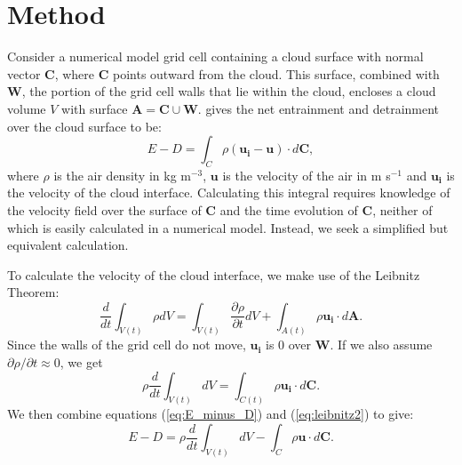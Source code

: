 \documentclass[12pt]{article}
\begin{document}

\section{Method}

Consider a numerical model grid cell containing a cloud surface with normal 
vector $\mathbf{C}$, where $\mathbf{C}$ points outward from the cloud.  This 
surface, combined with $\mathbf{W}$, the portion of the grid cell walls that 
lie within the cloud, encloses a cloud volume $V$ with surface $\mathbf{A}
= \mathbf{C} \cup \mathbf{W}$.  \cite{Siebesma1998} gives the net entrainment 
and detrainment over the cloud surface to be:
\begin{equation}
\label{eq:E_minus_D} 
E - D = \int_C \rho ( \mathbf{u_i} -  \mathbf{u}) \cdot d\mathbf{C},
\end{equation}
where $\rho$ is the air density in kg m$^{-3}$, $\mathbf{u}$ is the velocity
of the air in m s$^{-1}$ and $\mathbf{u_i}$ is the velocity of the cloud 
interface.  Calculating this integral requires knowledge of the velocity field
over the surface of $\mathbf{C}$ and the time evolution of $\mathbf{C}$, 
neither of which is easily calculated in a numerical model.  Instead, we seek a
simplified but equivalent calculation.

To calculate the velocity of the cloud interface, we make use of the Leibnitz 
Theorem:
\begin{equation}
\label{eq:leibnitz} 
\frac{d}{dt}\int_{V(t)} \rho dV = 
  \int_{V(t)} \frac{\partial \rho}{ \partial t} dV 
  + \int_{A(t)} \rho \mathbf{u_i}\cdot d\mathbf{A}.
\end{equation}
Since the walls of the grid cell do not move, $\mathbf{u_i}$ is 0 over 
$\mathbf{W}$.  If we also assume ${\partial \rho}/{ \partial t} \approx 0$, we
get
\begin{equation}
\label{eq:leibnitz2} 
    \rho \frac{d}{dt}\int_{V(t)} dV = 
    \int_{C(t)} \rho \mathbf{u_i}\cdot d\mathbf{C}.
\end{equation}
We then combine equations (\ref{eq:E_minus_D}) and (\ref{eq:leibnitz2}) to give:
\begin{equation}
\label{eq:step1} 
      E - D = \rho \frac{d}{dt}\int_{V(t)} dV
            - \int_C \rho \mathbf{u} \cdot d\mathbf{C}.
\end{equation}
\end{document}
